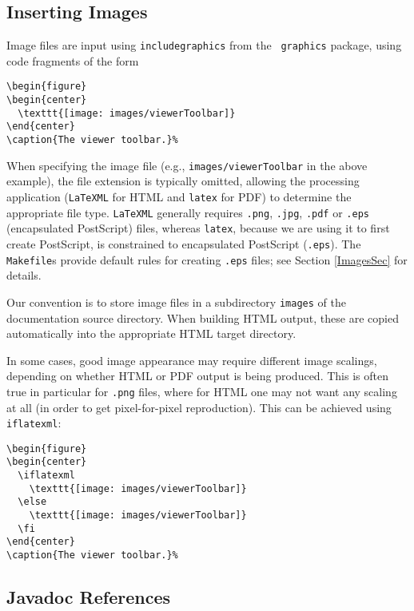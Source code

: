 \documentclass{article}
\begin{document}
\subsection{Inserting Images}
\label{InsertingImagesSec}

Image files are input using {\tt \BKS includegraphics} from the {\tt
graphics} package, using code fragments of the form
%
\begin{lstlisting}[]
\begin{figure}
\begin{center}
  \texttt{[image: images/viewerToolbar]}
\end{center}
\caption{The viewer toolbar.}%
\end{lstlisting}
%
When specifying the image file (e.g., {\tt images/viewerToolbar} in
the above example), the file extension is typically omitted, allowing
the processing application ({\tt LaTeXML} for HTML and {\tt latex} for
PDF) to determine the appropriate file type.  {\tt LaTeXML} generally
requires {\tt .png}, {\tt .jpg}, {\tt .pdf} or {\tt .eps}
(encapsulated PostScript) files, whereas {\tt latex}, because we are
using it to first create PostScript, is constrained to
encapsulated PostScript ({\tt .eps}). The {\tt Makefile}s
provide default rules for creating {\tt .eps} files; see Section
\ref{ImagesSec} for details.

Our convention is to store image files in a subdirectory {\tt images}
of the documentation source directory. When building HTML output,
these are copied automatically into the appropriate HTML target directory.

In some cases, good image appearance may require different image
scalings, depending on whether HTML or PDF output is being
produced. This is often true in particular for {\tt .png} files, where
for HTML one may not want any scaling at all (in order to get
pixel-for-pixel reproduction). This can be achieved using
{\tt \BKS iflatexml}:

\begin{lstlisting}[]
\begin{figure}
\begin{center}
  \iflatexml
    \texttt{[image: images/viewerToolbar]}
  \else
    \texttt{[image: images/viewerToolbar]}
  \fi
\end{center}
\caption{The viewer toolbar.}%
\end{lstlisting}

\subsection{Javadoc References}
\label{JavadocRefsSec}
\end{document}
